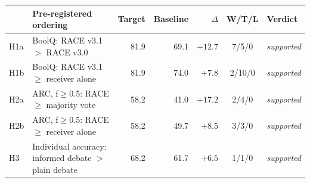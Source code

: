\begin{tabular}{@{}lp{5.2cm}rrrcl@{}}
\toprule
& Pre-registered ordering & Target & Baseline & $\Delta$ & W/T/L & Verdict\\
\midrule
H1a & BoolQ: RACE v3.1 $>$ RACE v3.0 & 81.9 & 69.1 & $+12.7$ & 7/5/0 & \textit{supported}\\
H1b & BoolQ: RACE v3.1 $\ge$ receiver alone & 81.9 & 74.0 & $+7.8$ & 2/10/0 & \textit{supported}\\
H2a & ARC, f$\ge$0.5: RACE $\ge$ majority vote & 58.2 & 41.0 & $+17.2$ & 2/4/0 & \textit{supported}\\
H2b & ARC, f$\ge$0.5: RACE $\ge$ receiver alone & 58.2 & 49.7 & $+8.5$ & 3/3/0 & \textit{supported}\\
H3 & Individual accuracy: informed debate $>$ plain debate & 68.2 & 61.7 & $+6.5$ & 1/1/0 & \textit{supported}\\
\bottomrule
\end{tabular}
